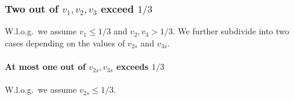 \documentclass[10pt,a4paper]{amsart}
\renewcommand{\epsilon}{\varepsilon} %
\theoremstyle{definition}
\newcommand{\alg}{\mathtt{opt}_{\mathrm{gs}}}
\newcommand{\opt}{\mathtt{opt}}
\newcommand{\vtwos}{v_{2s}}
\newcommand{\vthrees}{v_{3s}}
\begin{document}












\subsubsection{Two out of \texorpdfstring{$v_1,v_2,v_3$}{v1, v2, v3} exceed \texorpdfstring{$1/3$}{1/3}}
W.l.o.g.~we assume $v_1\le1/3$ and $v_2,v_3>1/3$. We further subdivide into two cases depending on the values of $\vtwos$ and $\vthrees$.

\paragraph{At most one out of $\vtwos,\vthrees$ exceeds $1/3$}
W.l.o.g.~we assume $\vtwos \le 1/3$.
\end{document}
